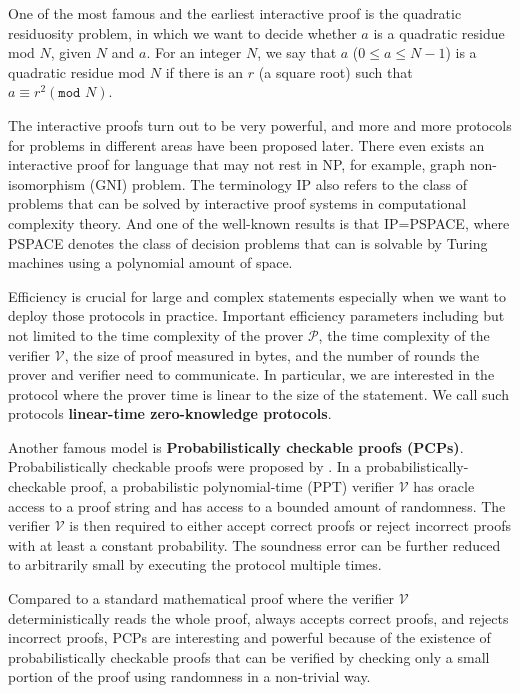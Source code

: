 One of the most famous and the earliest interactive proof is the quadratic residuosity problem, in which we want to decide whether $a$ is a quadratic residue mod $N$, given $N$ and $a$. For an integer $N$, we say that $a$ ($0 \le a \le N - 1$) is a quadratic residue mod $N$ if there is an $r$ (a square root) such that $ a \equiv r^2 ( \texttt{mod } N)$. 

The interactive proofs turn out to be very powerful, and more and more protocols for problems in different areas have been proposed later. There even exists an interactive proof for language that may not rest in NP, for example, graph non-isomorphism (GNI) problem.
The terminology IP also refers to the class of problems that can be solved by interactive proof systems in computational complexity theory. And one of the well-known results is that IP=PSPACE, where PSPACE denotes the class of decision problems that can is solvable by Turing machines using a polynomial amount of space.


Efficiency is crucial for large and complex statements especially when we want to deploy those protocols in practice. Important efficiency parameters including but not limited to the time complexity of the prover $\mathcal{P}$, the time complexity of the verifier $\mathcal{V}$, the size of proof measured in bytes, and the number of rounds the prover and verifier need to communicate. In particular, we are interested in the protocol where the prover time is linear to the size of the statement. We call such protocols \textbf{linear-time zero-knowledge protocols}.


Another famous model is \textbf{Probabilistically checkable proofs (PCPs)}. Probabilistically checkable proofs were proposed by \cite{DBLP:journals/tcs/FortnowRS94} \cite{DBLP:conf/stoc/BabaiFLS91}. In a probabilistically-checkable proof, a probabilistic polynomial-time (PPT) verifier $\mathcal{V}$ has oracle access to a proof string and has access to a bounded amount of randomness. The verifier $\mathcal{V}$ is then required to either accept correct proofs or reject incorrect proofs with at least a constant probability. The soundness error can be further reduced to arbitrarily small by executing the protocol multiple times.

Compared to a standard mathematical proof where the verifier $\mathcal{V}$ deterministically reads the whole proof, always accepts correct proofs, and rejects incorrect proofs, 
PCPs are interesting and powerful because of the existence of probabilistically checkable proofs that can be verified by checking only a small portion of the proof using randomness in a non-trivial way.

